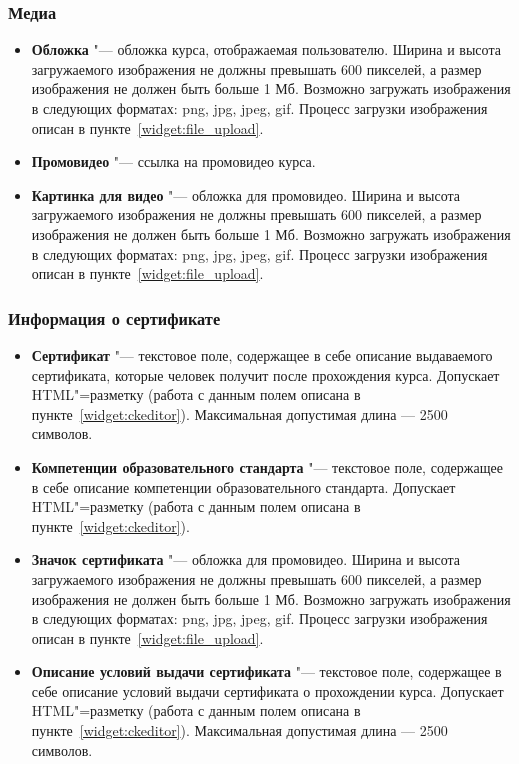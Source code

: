 \subsubsection{Медиа}
	\begin{itemize}
		\item \textbf{Обложка} "--- обложка курса, отображаемая пользователю. Ширина и высота загружаемого изображения не должны превышать 600 пикселей, а размер изображения не должен быть больше 1 Мб.
		Возможно загружать изображения в следующих форматах: png, jpg, jpeg, gif. Процесс загрузки изображения описан в пункте~\ref{widget:file_upload}.
		\item \textbf{Промовидео} "--- ссылка на промовидео курса.
		\item \textbf{Картинка для видео} "--- обложка для промовидео. Ширина и высота загружаемого изображения не должны превышать 600 пикселей, а размер изображения не должен быть больше 1 Мб. Возможно загружать изображения в следующих форматах: png, jpg, jpeg, gif. Процесс загрузки изображения описан в пункте~\ref{widget:file_upload}.
	\end{itemize}
\subsubsection{Информация о сертификате}
	\begin{itemize}
		\item \textbf{Сертификат} "--- текстовое поле, содержащее в себе описание выдаваемого сертификата, которые человек получит после прохождения курса. Допускает HTML"=разметку  (работа с данным полем описана в пункте~\ref{widget:ckeditor}).
		Максимальная допустимая длина --- 2500 символов.
		\item \textbf{Компетенции образовательного стандарта} "--- текстовое поле, содержащее в себе описание компетенции образовательного стандарта. Допускает HTML"=разметку (работа с данным полем описана в пункте~\ref{widget:ckeditor}).
		\item \textbf{Значок сертификата} "--- обложка для промовидео. Ширина и высота загружаемого изображения не должны превышать 600 пикселей, а размер изображения не должен быть больше 1 Мб. Возможно загружать изображения в следующих форматах: png, jpg, jpeg, gif. Процесс загрузки изображения описан в пункте~\ref{widget:file_upload}.
		\item \textbf{Описание условий выдачи сертификата} "--- текстовое поле, содержащее в себе описание условий выдачи сертификата о прохождении курса. Допускает HTML"=разметку (работа с данным полем описана в пункте~\ref{widget:ckeditor}).
		Максимальная допустимая длина --- 2500 символов.
	\end{itemize}
